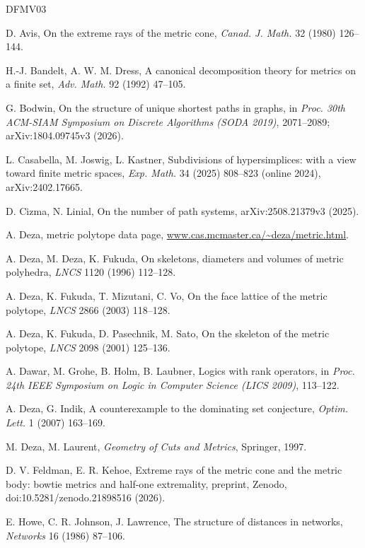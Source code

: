 \documentclass[11pt,a4paper]{article}
\theoremstyle{definition}
\theoremstyle{remark}
\begin{document}
\begin{thebibliography}{DFMV03}

 D. Avis, On the extreme rays of the metric cone, \emph{Canad. J. Math.} 32 (1980) 126--144.

 H.-J. Bandelt, A. W. M. Dress, A canonical decomposition theory for metrics on a finite set,
\emph{Adv. Math.} 92 (1992) 47--105.

 G. Bodwin, On the structure of unique shortest paths in graphs, in \emph{Proc. 30th
ACM-SIAM Symposium on Discrete Algorithms (SODA 2019)}, 2071--2089; arXiv:1804.09745v3 (2026).

 L. Casabella, M. Joswig, L. Kastner, Subdivisions of hypersimplices: with a view toward
finite metric spaces, \emph{Exp. Math.} 34 (2025) 808--823 (online 2024), arXiv:2402.17665.

 D. Cizma, N. Linial, On the number of path systems, arXiv:2508.21379v3 (2025).

 A. Deza, metric polytope data page, \url{www.cas.mcmaster.ca/~deza/metric.html}.

 A. Deza, M. Deza, K. Fukuda, On skeletons, diameters and volumes of metric polyhedra,
\emph{LNCS} 1120 (1996) 112--128.

 A. Deza, K. Fukuda, T. Mizutani, C. Vo, On the face lattice of the metric polytope,
\emph{LNCS} 2866 (2003) 118--128.

 A. Deza, K. Fukuda, D. Pasechnik, M. Sato, On the skeleton of the metric polytope,
\emph{LNCS} 2098 (2001) 125--136.

 A. Dawar, M. Grohe, B. Holm, B. Laubner, Logics with rank operators, in \emph{Proc.
24th IEEE Symposium on Logic in Computer Science (LICS 2009)}, 113--122.

 A. Deza, G. Indik, A counterexample to the dominating set conjecture, \emph{Optim. Lett.} 1
(2007) 163--169.

 M. Deza, M. Laurent, \emph{Geometry of Cuts and Metrics}, Springer, 1997.

 D. V. Feldman, E. R. Kehoe, Extreme rays of the metric cone and the metric body: bowtie
metrics and half-one extremality, preprint, Zenodo, doi:10.5281/zenodo.21898516 (2026).

 E. Howe, C. R. Johnson, J. Lawrence, The structure of distances in networks,
\emph{Networks} 16 (1986) 87--106.


\end{thebibliography}
\end{document}
